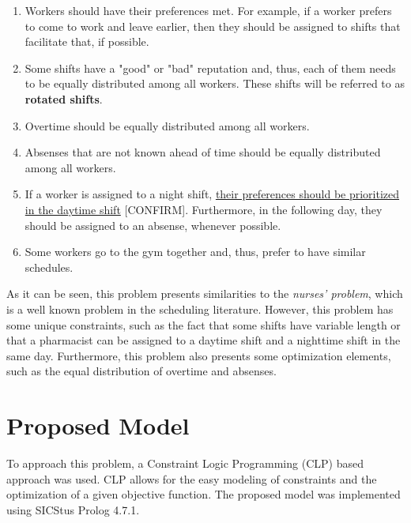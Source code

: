 \documentclass[conference]{IEEEtran}
\def\CONFIRM#1{\underline{#1} {\color{red}[CONFIRM]\color{black}}}
\begin{document}
\begin{enumerate}[resume]
    \item {
        \label{criterion:worker-preferences}
        Workers should have their preferences met. For example, if a worker prefers to come to work and leave earlier, then they should be assigned to shifts that facilitate that, if possible.
    }
    \item {
        \label{criterion:rotated-shifts-distribution}
        Some shifts have a "good" or "bad" reputation and, thus, each of them needs to be equally distributed among all workers. These shifts will be referred to as \textbf{rotated shifts}.
    }
    \item {
        \label{criterion:overtime-distribution}
        Overtime should be equally distributed among all workers.
    }
    \item {
        \label{criterion:absenses-distribution}
        Absenses that are not known ahead of time should be equally distributed among all workers.
    }
    \item {
        \label{criterion:nighttime-workers-prioritzation}
        If a worker is assigned to a night shift, \CONFIRM{their preferences should be prioritized in the daytime shift}. Furthermore, in the following day, they should be assigned to an absense, whenever possible.
    }
    \item {
        \label{criterion:worker-groups}
        Some workers go to the gym together and, thus, prefer to have similar schedules.
    }
\end{enumerate}

As it can be seen, this problem presents similarities to the \textit{nurses' problem}, which is a well known problem in the scheduling literature. However, this problem has some unique constraints, such as the fact that some shifts have variable length or that a pharmacist can be assigned to a daytime shift and a nighttime shift in the same day. Furthermore, this problem also presents some optimization elements, such as the equal distribution of overtime and absenses.

\section{Proposed Model}
\label{section:proposed-model}

To approach this problem, a Constraint Logic Programming (CLP) based approach was used. CLP allows for the easy modeling of constraints and the optimization of a given objective function.
The proposed model was implemented using SICStus Prolog 4.7.1. 
\end{document}
